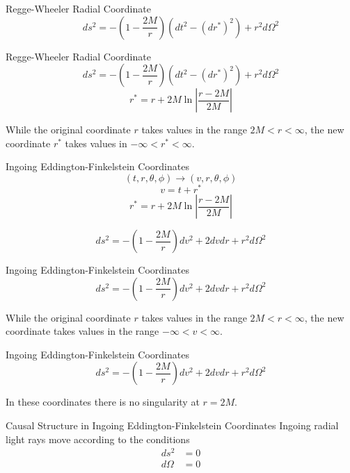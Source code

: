 \documentclass{beamer}
\begin{document}
\begin{darkframes}
\begin{frame}{Regge-Wheeler Radial Coordinate}
            $$ ds^2 = - \left( 1 - \frac{2M}{r} \right) 
            \left( dt^2 - (dr^*)^2 \right)
            + r^2 d\Omega^{2} $$
    	\end{frame}
        
        \begin{frame}{Regge-Wheeler Radial Coordinate}
            $$ ds^2 = - \left( 1 - \frac{2M}{r} \right) 
            \left( dt^2 - (dr^*)^2 \right)
            + r^2 d\Omega^{2} $$
            $$ r^{*} = r + 2M \ln\left| \frac{r-2M}{2M}\right| $$
            \pause
            \bigskip
            
            While the original coordinate $r$ takes values in the range $2M < r < \infty$,
the new coordinate $r^{*}$ takes values in $ -\infty < r^{*}< \infty$.
    	\end{frame}
        
        \begin{frame}{Ingoing Eddington-Finkelstein Coordinates}
        	$$ (t, r, \theta, \phi) \longrightarrow (v, r, \theta, \phi) $$
            \pause
            $$ v = t + r^* $$
            \pause
        	$$ r^{*} = r + 2M \ln\left| \frac{r-2M}{2M}\right| $$
            \pause
            \bigskip
            
            $$ ds^2 = -\left( 1 - \frac{2M}{r} \right) dv^2 
            + 2dvdr + r^2 d\Omega^2 $$
    	\end{frame}
        
        \begin{frame}{Ingoing Eddington-Finkelstein Coordinates}
            $$ ds^2 = -\left( 1 - \frac{2M}{r} \right) dv^2 
            + 2dvdr + r^2 d\Omega^2 $$
            \pause
            \bigskip
            
            While the original coordinate $r$ takes values in the range $2M < r < \infty$,
the new coordinate takes values in the range $ -\infty < v < \infty$.
    	\end{frame}
        
        \begin{frame}{Ingoing Eddington-Finkelstein Coordinates}
            $$ ds^2 = -\left( 1 - \frac{2M}{r} \right) dv^2 
            + 2dvdr + r^2 d\Omega^2 $$
            \pause
            \bigskip
            
            \centering
            {In these coordinates there is no singularity at $ r = 2M $.}
    	\end{frame}
        
        \begin{frame}{Causal Structure in Ingoing Eddington-Finkelstein Coordinates}
            Ingoing radial light rays move according to the conditions
            \begin{align*}
            	ds^2 &= 0\\ 
            	d\Omega &= 0
            \end{align*}
            \pause
            \bigskip
            

\end{frame}
\end{darkframes}
\end{document}
